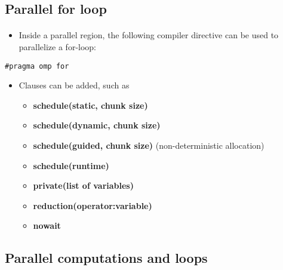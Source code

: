 \documentclass[%
oneside,                 %
final,                   %
10pt]{article}
\begin{document}
\subsection*{Parallel for loop}

\paragraph{}
\begin{itemize}
 \item Inside a parallel region, the following compiler directive can be used to parallelize a for-loop:
\end{itemize}

\noindent


\begin{verbatim}
#pragma omp for

\end{verbatim}

\begin{itemize}
\item Clauses can be added, such as
\begin{itemize}

  \item \textbf{schedule(static, chunk size)}

  \item \textbf{schedule(dynamic, chunk size)} 

  \item \textbf{schedule(guided, chunk size)} (non-deterministic allocation)

  \item \textbf{schedule(runtime)}

  \item \textbf{private(list of variables)}

  \item \textbf{reduction(operator:variable)}

  \item \textbf{nowait}
\end{itemize}

\noindent
\end{itemize}

\noindent



\subsection*{Parallel computations and loops}
\end{document}
